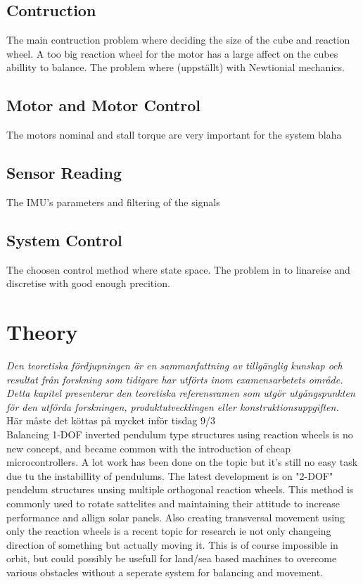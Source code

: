 \documentclass[a4paper,11pt]{kth-mag}
\begin{document}
\section{Contruction}
The main contruction problem where deciding the size of the cube and reaction wheel. A too big reaction wheel for the motor has a large affect on the cubes abillity to balance. The problem where (uppställt) with Newtionial mechanics.
 
\section{Motor and Motor Control}
The motors nominal and stall torque are very important for the system blaha
  
\section{Sensor Reading}
The IMU's parameters and filtering of the signals

\section{System Control}
The choosen control method where state space. The problem in to linareise and discretise with good enough precition.

\chapter{Theory}
\emph{Den teoretiska fördjupningen är en sammanfattning av tillgänglig kunskap och resultat från forskning som tidigare har utförts inom examensarbetets område. Detta kapitel presenterar den teoretiska referensramen som utgör utgångspunkten för den utförda forskningen, produktutvecklingen eller konstruktionsuppgiften.}
\\ Här måste det köttas på mycket inför tisdag 9/3 \\


Balancing 1-DOF inverted pendulum type structures using reaction wheels is no new concept, and became common with the introduction of cheap microcontrollers. A lot work has been done on the topic but it's still no easy task due tu the instabillity of pendulums. The latest development is on "2-DOF" pendelum structures unsing multiple orthogonal reaction wheels. This method is commonly used to rotate sattelites and maintaining their attitude to increase performance and allign solar panels. 
Also creating transversal movement using only the reaction wheels is a recent topic for research ie not only changeing direction of something but actually moving it. This is of course impossible in orbit, but could possibly be usefull for land/sea based machines to overcome various obstacles without a seperate system for balancing and movement.
 
\end{document}
